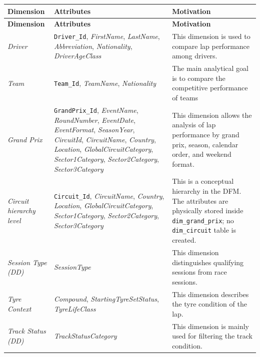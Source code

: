 \documentclass[a4paper,11pt]{article}
\begin{document}
	\begin{longtable}{|p{2.7cm}|p{5.3cm}|p{6.8cm}|}
		\hline
		\textbf{Dimension} & \textbf{Attributes} & \textbf{Motivation} \\
		\hline
		\endfirsthead
		
		\hline
		\textbf{Dimension} & \textbf{Attributes} & \textbf{Motivation} \\
		\hline
		\endhead
		
		\textit{Driver}
		& \texttt{Driver\_Id}, \textit{FirstName}, \textit{LastName}, \textit{Abbreviation}, \textit{Nationality}, \textit{DriverAgeClass}
		& This dimension is used to compare lap performance among drivers. \\
		\hline
		
		\textit{Team}
		& \texttt{Team\_Id}, \textit{TeamName}, \textit{Nationality}
		&  The main analytical goal is to compare
		the competitive performance of teams \\
		\hline
		
		\textit{Grand Prix}
		& \texttt{GrandPrix\_Id}, \textit{EventName}, \textit{RoundNumber}, \textit{EventDate},
		\textit{EventFormat}, \textit{SeasonYear}, \textit{CircuitId}, \textit{CircuitName},
		\textit{Country}, \textit{Location}, \textit{GlobalCircuitCategory},
		\textit{Sector1Category}, \textit{Sector2Category}, \textit{Sector3Category}
		& This dimension allows the analysis of lap performance by grand prix, season, calendar
		order, and weekend format. \\
		\hline
		
		\textit{Circuit hierarchy level}
		& \texttt{Circuit\_Id}, \textit{CircuitName}, \textit{Country}, \textit{Location},
		\textit{GlobalCircuitCategory}, \textit{Sector1Category}, \textit{Sector2Category},
		\textit{Sector3Category}
		& This is a conceptual hierarchy in the DFM. The attributes are physically stored
		inside \texttt{dim\_grand\_prix}; no \texttt{dim\_circuit} table is created. \\
		\hline
		
		\textit{Session Type (DD)}
		& \textit{SessionType}
		& This dimension distinguishes qualifying sessions from race sessions. \\
		\hline
		
		\textit{Tyre Context}
		& \textit{Compound}, \textit{StartingTyreSetStatus}, \textit{TyreLifeClass}
		& This dimension describes the tyre condition of the lap. \\
		\hline
		
		\textit{Track Status (DD)}
		&  \textit{TrackStatusCategory}
		& This dimension is mainly used for filtering the track condition. \\
		\hline
		

\end{longtable}
\end{document}
